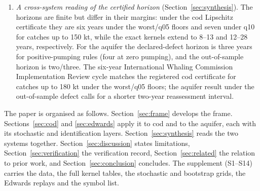 \begin{enumerate}[leftmargin=2em]
\item \emph{A cross-system reading of the certified horizon} (Section~\ref{sec:synthesis}). The horizons are finite but differ in their margins: under the cod Lipschitz certificate they are six years under the worst/q05 floors and seven under q10 for catches up to 150 kt, while the exact kernels extend to 8--13 and 12--28 years, respectively. For the aquifer the declared-defect horizon is three years for positive-pumping rules (four at zero pumping), and the out-of-sample horizon is two/three. The six-year International Whaling Commission Implementation Review cycle matches the registered cod certificate for catches up to 180 kt under the worst/q05 floors; the aquifer result under the out-of-sample defect calls for a shorter two-year reassessment interval.
\end{enumerate}

The paper is organised as follows. Section~\ref{sec:frame} develops the frame. Sections~\ref{sec:cod} and \ref{sec:edwards} apply it to cod and to the aquifer, each with its stochastic and identification layers. Section~\ref{sec:synthesis} reads the two systems together. Section~\ref{sec:discussion} states limitations, Section~\ref{sec:verification} the verification record, Section~\ref{sec:related} the relation to prior work, and Section~\ref{sec:conclusion} concludes. The supplement (S1--S14) carries the data, the full kernel tables, the stochastic and bootstrap grids, the Edwards replays and the symbol list.
